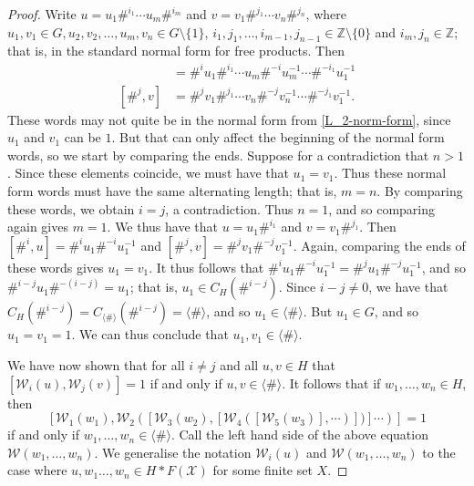 \documentclass[11pt]{amsart}
\theoremstyle{definition}
\numberwithin{theorem}{section}
\newcommand{\Z}{\mathbb{Z}}
\begin{document}
\begin{proof}
	Write \(u = u_1 \#^{i_1} \cdots u_m \#^{i_m}\) and \(v = v_1 \#^{j_1}
	\cdots v_n \#^{j_n}\), where \(u_1, v_1 \in G, u_2, v_2, \ldots, u_m,
	v_n \in G \setminus \{1\}\), \(i_1, j_1, \ldots, i_{m - 1}, j_{n - 1} \in
	\Z \setminus \{0\}\) and \(i_m, j_n \in \Z\); that is, in the standard
	normal form for free products. Then
	\begin{align*}
		[\#^i, u] & = \#^i u_1 \#^{i_1} \cdots u_m \#^{-i} u_m^{-1}
		\cdots \#^{-i_1} u_1^{-1} \\
		[\#^j, v] & = \#^j v_1 \#^{j_1} \cdots v_n \#^{-j} v_n^{-1}
		\cdots \#^{-j_1} v_1^{-1}. 
	\end{align*}
	These words may not quite be in the normal form from \cref{L_2-norm-form}, since \(u_1\) and
	\(v_1\) can be \(1\). But that can only affect the beginning of the normal
	form words, so we start by comparing the ends. Suppose for a contradiction
	that \(n > 1\). Since these elements
	coincide, we must have that
	\(u_1 = v_1\). Thus these normal form words must have the same alternating
	length; that is, \(m = n\). By comparing these words, we
	obtain \(i = j\), a contradiction. Thus \(n = 1\), and so comparing again
	gives \(m = 1\). We thus have that \(u = u_1 \#^{i_1}\) and
	\(v = v_1 \#^{j_1}\). Then \([\#^i, u] = \#^i u_1 \#^{-i} u_1^{-1}\)
	and \([\#^j, v] = \#^j v_1 \#^{-j} v_1^{-1}\). Again, comparing the
	ends of these words gives \(u_1 = v_1\). It thus follows that
	\(\#^i u_1 \#^{-i} u_1^{-1} = \#^j u_1 \#^{-j} u_1^{-1}\), and so
	\(\#^{i - j} u_1 \#^{-(i - j)} = u_1\); that is, \(u_1 \in
	C_H(\#^{i - j})\). Since \(i - j \neq 0\), we have that
	\(C_H(\#^{i -j}) = C_{\langle \# \rangle}(\#^{i - j}) = \langle \# \rangle\),
	and so \(u_1 \in \langle \# \rangle\). But \(u_1 \in G\), and so
	\(u_1 = v_1 = 1\). We can thus conclude that \(u_1, v_1 \in \langle \#
	\rangle\).

	We have now shown that for all \(i \neq j\) and all \(u, v \in H\) that
	\([\mathcal W_i(u), \mathcal W_j(v)] = 1\) if and only if \(u, v \in
	\langle \# \rangle\). It follows that if \(w_1, \ldots, w_n \in H\), then
	\[
		[\mathcal W_1(w_1), 
		\mathcal W_2([\mathcal W_3(w_2), 
		[\mathcal W_4([\mathcal W_5(w_3)], \cdots )])] \cdots )] = 1
	\]
	if and only if \(w_1, \ldots, w_n \in \langle \# \rangle\). Call
	the left hand side of the above equation \(\mathcal W(w_1, \ldots, w_n)\).
	We generalise the notation \(\mathcal W_i(u)\) and \(\mathcal W(w_1, \ldots, w_n)\)
	to the case where \(u, w_1 \ldots, w_n \in H \ast F(\mathcal X)\) for some finite
	set \(X\).


\end{proof}
\end{document}
